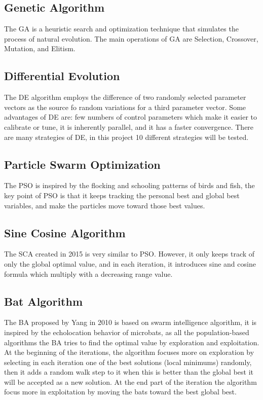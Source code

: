 \documentclass[12pt]{article}
\begin{document}
\subsection{Genetic Algorithm}

The GA is a heuristic search and optimization technique that simulates the process of natural evolution. The main operations of GA are Selection, Crossover, Mutation, and Elitism.

\subsection{Differential Evolution}
The DE algorithm employs the difference of two randomly selected parameter vectors as the source fo random variations for a third parameter vector. Some advantages of DE are: few numbers of control parameters which make it easier to calibrate or tune, it is inherently parallel, and it has a faster convergence. 
There are many strategies of DE, in this project 10 different strategies will be tested.

\subsection{Particle Swarm Optimization}
The PSO is inspired by the flocking and schooling patterns of birds and fish, the key point of PSO is that it keeps tracking the personal best and global best variables, and make the particles move toward those best values.

\subsection{Sine Cosine Algorithm}
The SCA created in 2015 is very similar to PSO. However, it only keeps track of only the global optimal value, and in each iteration, it introduces sine and cosine formula which multiply with a decreasing range value.

\subsection{Bat Algorithm}
The BA proposed by Yang in 2010 is based on swarm intelligence algorithm, it is inspired by the echolocation behavior of microbats, as all the population-based algorithms the BA tries to find the optimal value by exploration and exploitation. At the beginning of the iterations, the algorithm focuses more on exploration by selecting in each iteration one of the best solutions (local minimums) randomly, then it adds a random walk step to it when this is better than the global best it will be accepted as a new solution. At the end part of the iteration the algorithm focus more in exploitation by moving the bats toward the best global best.
\end{document}
